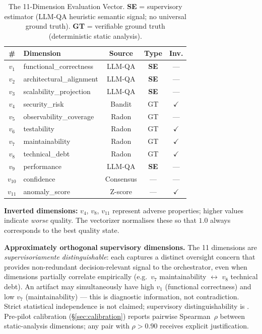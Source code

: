 \documentclass[manuscript,review,anonymous]{acmart}
\begin{document}
\begin{table}[t]
  \caption{The 11-Dimension Evaluation Vector.
    \textbf{SE} = supervisory estimator (LLM-QA heuristic semantic signal;
    no universal ground truth).
    \textbf{GT} = verifiable ground truth (deterministic static analysis).}
  \label{tab:vector}
  \begin{tabular}{clccc}
    \toprule
    \# & Dimension & Source & Type & Inv. \\
    \midrule
    $v_1$ & functional\_correctness & LLM-QA & \textbf{SE} & --- \\
    $v_2$ & architectural\_alignment & LLM-QA & \textbf{SE} & --- \\
    $v_3$ & scalability\_projection & LLM-QA & \textbf{SE} & --- \\
    $v_4$ & security\_risk & Bandit & GT & $\checkmark$ \\
    $v_5$ & observability\_coverage & Radon & GT & --- \\
    $v_6$ & testability & Radon & GT & $\checkmark$ \\
    $v_7$ & maintainability & Radon & GT & $\checkmark$ \\
    $v_8$ & technical\_debt & Radon & GT & $\checkmark$ \\
    $v_9$ & performance & LLM-QA & \textbf{SE} & --- \\
    $v_{10}$ & confidence & Consensus & --- & --- \\
    $v_{11}$ & anomaly\_score & Z-score & --- & $\checkmark$ \\
    \bottomrule
  \end{tabular}
\end{table}

\noindent \textbf{Inverted dimensions:} $v_4$, $v_8$, $v_{11}$ represent adverse
properties; higher values indicate \textit{worse} quality. The vectorizer normalises
these so that $1.0$ always corresponds to the best quality state.

\medskip
\noindent \textbf{Approximately orthogonal supervisory dimensions.}
The 11 dimensions are \textit{supervisoriamente distinguishable}: each captures a
distinct oversight concern that provides non-redundant decision-relevant signal to the
orchestrator, even when dimensions partially correlate empirically
(e.g.\ $v_7$ maintainability $\leftrightarrow$ $v_8$ technical debt).
An artifact may simultaneously have high $v_1$ (functional correctness) and low $v_7$
(maintainability) --- this is diagnostic information, not contradiction.
Strict statistical independence is not claimed; supervisory distinguishability is
\citep[cf.][for the analogous argument in MQM translation evaluation]{lommel2014}.
Pre-pilot calibration (\S\ref{sec:calibration}) reports pairwise Spearman~$\rho$ between
static-analysis dimensions; any pair with $\rho > 0.90$ receives explicit justification.
\end{document}
